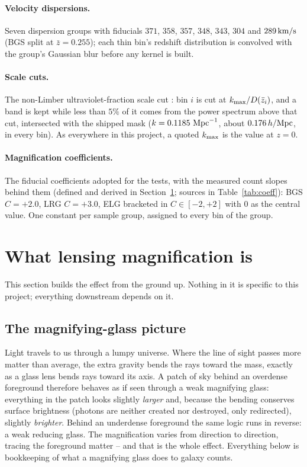 \documentclass[11pt]{article}
\newcommand{\kmax}{k_{\rm max}}
\newcommand{\hMpc}{\,h/{\rm Mpc}}
\newcommand{\kms}{\,{\rm km/s}}
\begin{document}
\paragraph{Velocity dispersions.}
Seven dispersion groups with fiducials $371$, $358$, $357$, $348$,
$343$, $304$ and $289\kms$ (BGS split at $\bar z = 0.255$); each thin
bin's redshift distribution is convolved with the group's Gaussian
blur before any kernel is built.

\paragraph{Scale cuts.}
The non-Limber ultraviolet-fraction scale cut \cite{Saraivanov2026}:
bin $i$ is cut at $\kmax/D(\bar z_i)$, and a band is kept while less
than $5\%$ of it comes from the power spectrum above that cut,
intersected with the shipped mask ($k = 0.1185~{\rm Mpc}^{-1}$, about
$0.176\hMpc$, in every bin).  As everywhere in this project, a quoted
$\kmax$ is the value at $z = 0$.

\paragraph{Magnification coefficients.}
The fiducial coefficients adopted for the tests, with the measured
count slopes behind them (defined and derived in
Section~\ref{sec:what}; sources in Table~\ref{tab:coeff}): BGS
$C = +2.0$, LRG $C = +3.0$, ELG bracketed in $C \in [-2, +2]$ with $0$
as the central value.  One constant per sample group, assigned to
every bin of the group.

\section{What lensing magnification is}
\label{sec:what}

This section builds the effect from the ground up.  Nothing in it is
specific to this project; everything downstream depends on it.

\subsection{The magnifying-glass picture}
\label{sec:glass}

Light travels to us through a lumpy universe.  Where the line of
sight passes more matter than average, the extra gravity bends the
rays toward the mass, exactly as a glass lens bends rays toward its
axis.  A patch of sky behind an overdense foreground therefore
behaves as if seen through a weak magnifying glass: everything in the
patch looks slightly \emph{larger} and, because the bending conserves
surface brightness (photons are neither created nor destroyed, only
redirected), slightly \emph{brighter}.  Behind an underdense
foreground the same logic runs in reverse: a weak reducing glass.
The magnification varies from direction to direction, tracing the
foreground matter -- and that is the whole effect.  Everything below
is bookkeeping of what a magnifying glass does to galaxy counts.
\end{document}
